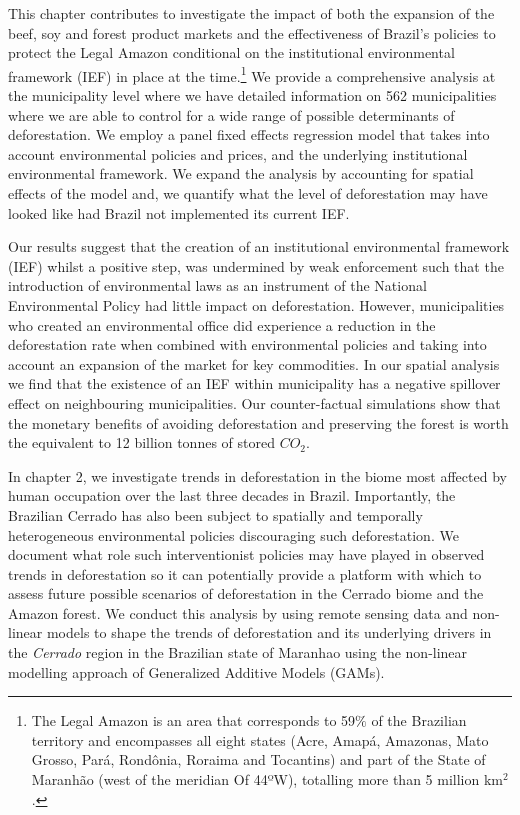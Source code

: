 This chapter contributes to investigate the impact of both the expansion of the beef, soy and forest product markets and the effectiveness of Brazil's policies to protect the Legal Amazon conditional on the institutional environmental framework (IEF) in place at the time.\footnote{The Legal Amazon is an area that corresponds to 59$\%$ of the Brazilian territory and encompasses all eight states (Acre, Amapá, Amazonas, Mato Grosso, Pará, Rondônia, Roraima and Tocantins) and part of the State of Maranhão (west of the meridian Of 44ºW), totalling more than 5 million km$^{2}$.} We provide a comprehensive analysis at the municipality level where we have detailed information on 562 municipalities where we are able to control for a wide range of possible determinants of deforestation. We employ a panel fixed effects regression model that takes into account environmental policies and prices, and the underlying institutional environmental framework. We expand the analysis by accounting for spatial effects of the model and, we quantify what the level of deforestation may have looked like had Brazil not implemented its current IEF.

Our results suggest that the creation of an institutional environmental framework (IEF) whilst a positive step, was undermined by weak enforcement such that the introduction of environmental laws as an instrument of the National Environmental Policy had little impact on deforestation. However, municipalities who created an environmental office did experience a reduction in the deforestation rate when combined with environmental policies and taking into account an expansion of the market for key commodities. In our spatial analysis we find that the existence of an IEF within municipality has a negative spillover effect on neighbouring municipalities. Our counter-factual simulations show that the monetary benefits of avoiding deforestation and preserving the forest is worth the equivalent to 12 billion tonnes of stored $CO_{2}$.


In chapter 2, we investigate trends in deforestation in the biome most affected by human occupation over the last three decades in Brazil. Importantly, the Brazilian Cerrado has also been subject to spatially and temporally heterogeneous environmental policies discouraging such deforestation. We document what role such interventionist policies may have played in observed trends in deforestation so it can potentially provide a platform with which to assess future possible scenarios of deforestation in the Cerrado biome and the Amazon forest. We conduct this analysis by using remote sensing data and non-linear models to shape the trends of deforestation and its underlying drivers in the \textit{Cerrado} region in the Brazilian state of Maranhao using the non-linear modelling approach of Generalized Additive Models (GAMs). 

